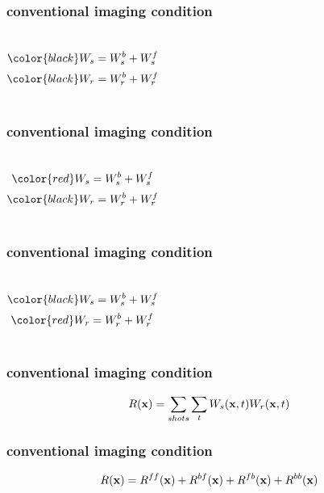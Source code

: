 \begin{frame}  \frametitle{conventional imaging condition}

\begin{columns}
\vspace{0.2in}
\[
\color{black} \US= \USr + \USt
\]
\vspace{0.3in}
\[
\color{black} \UR= \URr + \URt
\]
\end{columns}

\end{frame}



\begin{frame} \frametitle{conventional imaging condition}
\begin{columns}
\vspace{0.2in}
\[
\color{red} \US= \USr + \USt
\]
\vspace{0.3in}
\[
\color{black} \UR= \URr + \URt
\]
\end{columns}

\end{frame}



\begin{frame}  \frametitle{conventional imaging condition}

\begin{columns}
\vspace{0.2in}
\[
\color{black} \US= \USr + \USt
\]
\vspace{0.3in}
\[
\color{red} \UR= \URr + \URt
\]
\end{columns}

\end{frame}

\begin{frame} \frametitle{conventional imaging condition}
 \[
    R({\bf x})= \sum_{shots} \sum_{t} {W_s}({\bf x},t) {W_r}({\bf x},t)
 \]
\end{frame}

\begin{frame} \frametitle{conventional imaging condition}
 \[
    R({\bf x})= R^{ff}({\bf x})+R^{bf}({\bf x}) + R^{fb}({\bf x})+R^{bb}({\bf x}) 
 \]
\end{frame}


